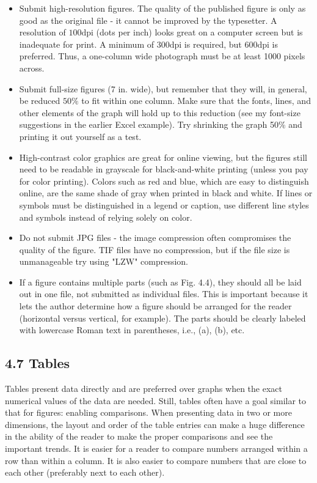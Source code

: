 \begin{itemize}
  \item Submit high-resolution figures. The quality of the published figure is only as good as the original file - it cannot be improved by the typesetter. A resolution of $100 \mathrm{dpi}$ (dots per inch) looks great on a computer screen but is inadequate for print. A minimum of $300 \mathrm{dpi}$ is required, but $600 \mathrm{dpi}$ is preferred. Thus, a one-column wide photograph must be at least 1000 pixels across.
  \item Submit full-size figures (7 in. wide), but remember that they will, in general, be reduced $50 \%$ to fit within one column. Make sure that the fonts, lines, and other elements of the graph will hold up to this reduction (see my font-size suggestions in the earlier Excel example). Try shrinking the graph 50\% and printing it out yourself as a test.
  \item High-contrast color graphics are great for online viewing, but the figures still need to be readable in grayscale for black-and-white printing (unless you pay for color printing). Colors such as red and blue, which are easy to distinguish online, are the same shade of gray when printed in black and white. If lines or symbols must be distinguished in a legend or caption, use different line styles and symbols instead of relying solely on color.
  \item Do not submit JPG files - the image compression often compromises the quality of the figure. TIF files have no compression, but if the file size is unmanageable try using "LZW" compression.
  \item If a figure contains multiple parts (such as Fig. 4.4), they should all be laid out in one file, not submitted as individual files. This is important because it lets the author determine how a figure should be arranged for the reader (horizontal versus vertical, for example). The parts should be clearly labeled with lowercase Roman text in parentheses, i.e., (a), (b), etc.
\end{itemize}

\subsection*{4.7 Tables}
Tables present data directly and are preferred over graphs when the exact numerical values of the data are needed. Still, tables often have a goal similar to that for figures: enabling comparisons. When presenting data in two or more dimensions, the layout and order of the table entries can make a huge difference in the ability of the reader to make the proper comparisons and see the important trends. It is easier for a reader to compare numbers arranged within a row than within a column. It is also easier to compare numbers that are close to each other (preferably next to each other).

